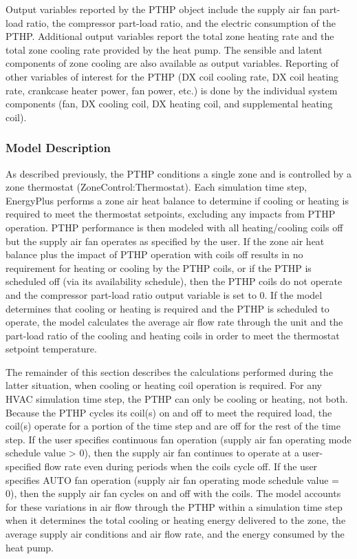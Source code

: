 Output variables reported by the PTHP object include the supply air fan part-load ratio, the compressor part-load ratio, and the electric consumption of the PTHP. Additional output variables report the total zone heating rate and the total zone cooling rate provided by the heat pump. The sensible and latent components of zone cooling are also available as output variables. Reporting of other variables of interest for the PTHP (DX coil cooling rate, DX coil heating rate, crankcase heater power, fan power, etc.) is done by the individual system components (fan, DX cooling coil, DX heating coil, and supplemental heating coil).

\subsubsection{Model Description}\label{model-description-1-008}

As described previously, the PTHP conditions a single zone and is controlled by a zone thermostat (ZoneControl:Thermostat). Each simulation time step, EnergyPlus performs a zone air heat balance to determine if cooling or heating is required to meet the thermostat setpoints, excluding any impacts from PTHP operation. PTHP performance is then modeled with all heating/cooling coils off but the supply air fan operates as specified by the user. If the zone air heat balance plus the impact of PTHP operation with coils off results in no requirement for heating or cooling by the PTHP coils, or if the PTHP is scheduled off (via its availability schedule), then the PTHP coils do not operate and the compressor part-load ratio output variable is set to 0. If the model determines that cooling or heating is required and the PTHP is scheduled to operate, the model calculates the average air flow rate through the unit and the part-load ratio of the cooling and heating coils in order to meet the thermostat setpoint temperature.

The remainder of this section describes the calculations performed during the latter situation, when cooling or heating coil operation is required. For any HVAC simulation time step, the PTHP can only be cooling or heating, not both. Because the PTHP cycles its coil(s) on and off to meet the required load, the coil(s) operate for a portion of the time step and are off for the rest of the time step. If the user specifies continuous fan operation (supply air fan operating mode schedule value \textgreater{} 0), then the supply air fan continues to operate at a user-specified flow rate even during periods when the coils cycle off. If the user specifies AUTO fan operation (supply air fan operating mode schedule value = 0), then the supply air fan cycles on and off with the coils. The model accounts for these variations in air flow through the PTHP within a simulation time step when it determines the total cooling or heating energy delivered to the zone, the average supply air conditions and air flow rate, and the energy consumed by the heat pump.

